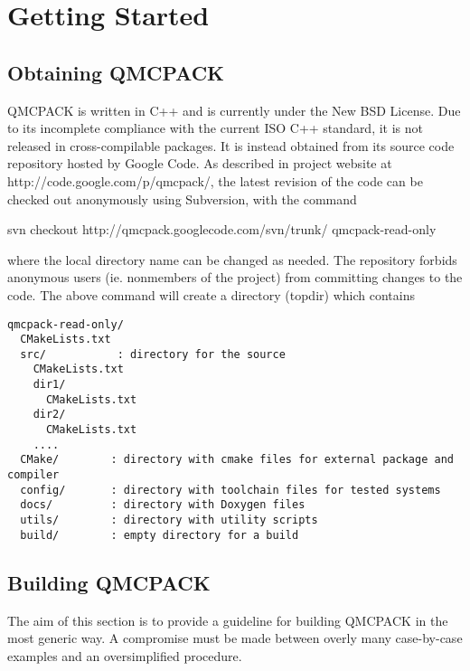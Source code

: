 \chapter{Getting Started}
\section{Obtaining QMCPACK}
QMCPACK is written in C++ and is currently under the New BSD License.  Due to its incomplete compliance with the current ISO C++ standard, it is not released in cross-compilable packages.  It is instead obtained from its source code repository hosted by Google Code.  As described in project website at http://code.google.com/p/qmcpack/, the latest revision of the code can be checked out anonymously using Subversion, with the command
\begin{term}
svn checkout http://qmcpack.googlecode.com/svn/trunk/ qmcpack-read-only
\end{term}
where the local directory name  can be changed as needed.  The repository forbids anonymous users (ie. nonmembers of the project) from committing changes to the code.  The above command will create a directory  (topdir) which contains
\begin{verbatim} 
qmcpack-read-only/
  CMakeLists.txt
  src/           : directory for the source
    CMakeLists.txt
    dir1/
      CMakeLists.txt
    dir2/
      CMakeLists.txt
    ....
  CMake/        : directory with cmake files for external package and compiler
  config/       : directory with toolchain files for tested systems
  docs/         : directory with Doxygen files
  utils/        : directory with utility scripts
  build/        : empty directory for a build 
\end{verbatim}

\section{Building QMCPACK}
The aim of this section is to provide a guideline for building QMCPACK in the most generic way.
A compromise must be made between overly many case-by-case examples and an oversimplified procedure.


